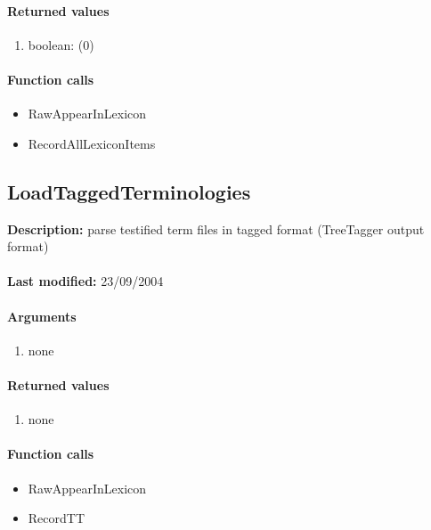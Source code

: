 \paragraph{Returned values}
\begin{enumerate}
\item boolean: (0)
\end{enumerate}

\paragraph{Function calls}
\begin{itemize}
\item RawAppearInLexicon
\item RecordAllLexiconItems
\end{itemize}

\subsection{LoadTaggedTerminologies}
\textbf{Description:} parse testified term files in tagged format (TreeTagger output format)\\
\\\textbf{Last modified:} 23/09/2004

\paragraph{Arguments}
\begin{enumerate}
\item none
\end{enumerate}

\paragraph{Returned values}
\begin{enumerate}
\item none
\end{enumerate}

\paragraph{Function calls}
\begin{itemize}
\item RawAppearInLexicon
\item RecordTT
\end{itemize}

